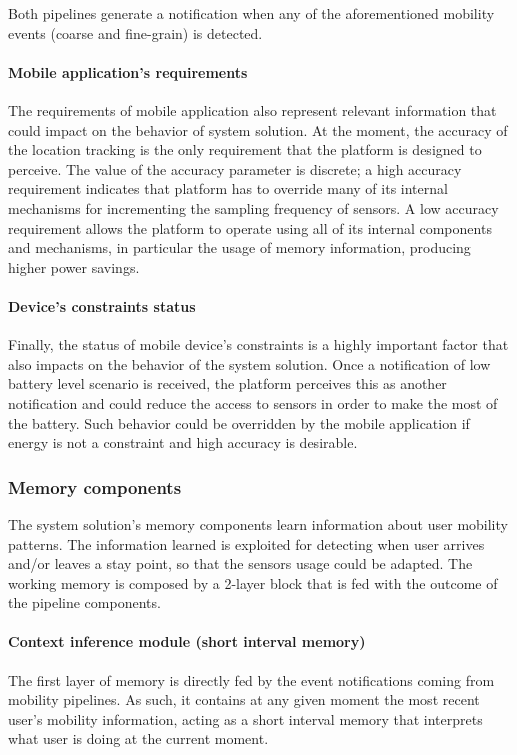 \documentclass[ENG,PhD]{cinvestav}
\begin{document}
Both pipelines generate a notification when any of the aforementioned mobility events (coarse and fine-grain) is detected.

\paragraph*{Mobile application's requirements}
The requirements of mobile application also represent relevant information that could impact on the behavior of system solution.
At the moment, the accuracy of the location tracking is the only requirement that the platform is designed to perceive.
The value of the accuracy parameter is discrete; a high accuracy requirement indicates that platform has to override many of its internal mechanisms for incrementing the sampling frequency of sensors.
A low accuracy requirement allows the platform to operate using all of its internal components and mechanisms, in particular the usage of memory information, producing higher power savings.

\paragraph*{Device's constraints status} 
Finally, the status of mobile device's constraints is a highly important factor that also impacts on the behavior of the system solution.
Once a notification of low battery level scenario is received, the platform perceives this as another notification and could reduce the access to sensors in order to make the most of the battery.
Such behavior could be overridden by the mobile application if energy is not a constraint and high accuracy is desirable.

\subsubsection{Memory components}
The system solution's memory components learn information about user mobility patterns.
The information learned is exploited for detecting when user arrives and/or leaves a stay point, so that the sensors usage could be adapted.
The working memory is composed by a 2-layer block that is fed with the outcome of the pipeline components.

\paragraph*{Context inference module (short interval memory)}
The first layer of memory is directly fed by the event notifications coming from mobility pipelines.
As such, it contains at any given moment the most recent user's mobility information, acting as a short interval memory that interprets what user is doing at the current moment.
\end{document}
